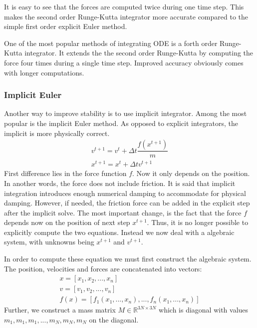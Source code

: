 \documentclass[en]{minipw} %
\begin{document}
It is easy to see that the forces are computed twice during one time step. This makes the second order Runge-Kutta integrator more accurate compared to the simple first order explicit Euler method.

One of the most popular methods of integrating ODE is a forth order Runge-Kutta integrator. It extends the the second order Runge-Kutta by computing the force four times during a single time step. Improved accuracy obviously comes with longer computations.

\subsubsection{Implicit Euler}
Another way to improve stability is to use implicit integrator. Among the most popular is the implicit Euler method. As opposed to explicit integrators, the implicit is more physically correct.
\begin{equation}
\label{eq:implicit_euler_ode_v}
\begin{aligned}
v^{t+1} = v^{t} + \Delta t \dfrac{f(x^{t+1})}{m}
\\
x^{t+1} = x^{t} + \Delta t v^{t+1}
\end{aligned}
\end{equation}
First difference lies in the force function $f$. Now it only depends on the position. In another words, the force does not include friction. It is said that implicit integration introduces enough numerical damping to accommodate for physical damping. However, if needed, the friction force can be added in the explicit step after the implicit solve. The most important change, is the fact that the force $f$ depends now on the position of next step $x^{t+1}$. Thus, it is no longer possible to explicitly compute the two equations. Instead we now deal with a algebraic system, with unknowns being $x^{t+1}$ and $v^{t+1}$.

In order to compute these equation we must first construct the algebraic system. The position, velocities and forces are concatenated into vectors:
\begin{equation}
\begin{aligned}
x = [x_1, x_2, ..., x_n]
\\
v = [v_1, v_2, ..., v_n]
\\
f(x) = [f_1(x_1,..., x_n), ..., f_n(x_1,..., x_n)]
\end{aligned}
\end{equation}
Further, we construct a mass matrix $M \in \mathbb{R}^{3N \times 3N}$ which is diagonal with values $m_1, m_1, m_1, ..., m_N, m_N, m_N$ on the diagonal.
\end{document}

